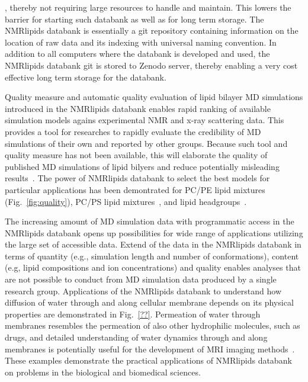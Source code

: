 \documentclass[fleqn,10pt]{wlscirep}
\begin{document}

, thereby not requiring large resources to handle and maintain. This lowers the barrier for starting such databank as well as for long term storage. The NMRlipids databank is essentially a git repository containing information on the location of raw data and its indexing with universal naming convention. In addition to all computers where the databank is developed and used, the NMRlipids databank git is stored to Zenodo server, thereby enabling a very cost effective long term storage for the databank. 

Quality measure and automatic quality evaluation of lipid bilayer MD simulations introduced in the NMRlipids databank enables rapid ranking of available simulation models agains experimental NMR and x-ray scattering data. This provides a tool for researches to rapidly evaluate the credibility of MD simulations of their own and reported by other groups. Because such tool and quality measure has not been available, this will elaborate the quality of published MD simulations of lipid bilyers and reduce potentially misleading results~\cite{antila22b}. The power of NMRlipids databank to select the best models for particular applications has been demontrated for PC/PE lipid mixtures (Fig.~\ref{fig:quality}), PC/PS lipid mixtures~\cite{antila22b}, and lipid headgroups~\cite{bacle21}.

The increasing amount of MD simulation data with programmatic access in the NMRlipids databank opens up possibilities for wide range of applications utilizing the large set of accessible data. Extend of the data in the NMRlipids databank in terms of quantity (e.g., simulation length and number of conformations), content (e.g, lipid compositions and ion concentrations) and quality enables analyses that are not possible to conduct from MD simulation data produced by a single research group. Applications of the NMRlipids databank to understand how diffusion of water through and along cellular membrane depends on its physical properties are demonstrated in Fig.~\ref{??}. Permeation of water through membranes resembles the permeation of also other hydrophilic molecules, such as drugs, and detailed understanding of water dynamics through and along membranes is potentially useful for the development of MRI imaging methods~\cite{topgaard20}. 
These examples demonstrate the practical applications of NMRlipids databank on problems in the biological and biomedical sciences.
\end{document}
